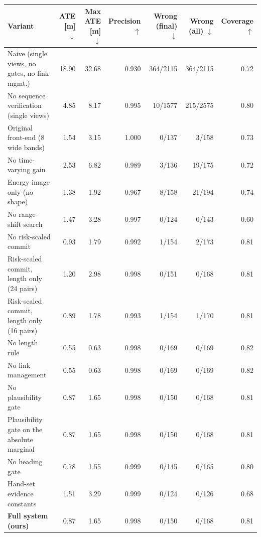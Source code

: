 \begin{tabular}{lrrrrrr}
\toprule
Variant & ATE [m] $\downarrow$ & Max ATE [m] $\downarrow$ & Precision $\uparrow$ & Wrong (final) $\downarrow$ & Wrong (all) $\downarrow$ & Coverage $\uparrow$ \\
\midrule
Naive (single views, no gates, no link mgmt.) & 18.90 & 32.68 & 0.930 & 364/2115 & 364/2115 & 0.72 \\
No sequence verification (single views) & 4.85 & 8.17 & 0.995 & 10/1577 & 215/2575 & 0.80 \\
Original front-end (8 wide bands) & 1.54 & 3.15 & 1.000 & 0/137 & 3/158 & 0.73 \\
No time-varying gain & 2.53 & 6.82 & 0.989 & 3/136 & 19/175 & 0.72 \\
Energy image only (no shape) & 1.38 & 1.92 & 0.967 & 8/158 & 21/194 & 0.74 \\
No range-shift search & 1.47 & 3.28 & 0.997 & 0/124 & 0/143 & 0.60 \\
No risk-scaled commit & 0.93 & 1.79 & 0.992 & 1/154 & 2/173 & 0.81 \\
Risk-scaled commit, length only (24 pairs) & 1.20 & 2.98 & 0.998 & 0/151 & 0/168 & 0.81 \\
Risk-scaled commit, length only (16 pairs) & 0.89 & 1.78 & 0.993 & 1/154 & 1/170 & 0.81 \\
No length rule & 0.55 & 0.63 & 0.998 & 0/169 & 0/169 & 0.82 \\
No link management & 0.55 & 0.63 & 0.998 & 0/169 & 0/169 & 0.82 \\
No plausibility gate & 0.87 & 1.65 & 0.998 & 0/150 & 0/168 & 0.81 \\
Plausibility gate on the absolute marginal & 0.87 & 1.65 & 0.998 & 0/150 & 0/168 & 0.81 \\
No heading gate & 0.78 & 1.55 & 0.999 & 0/145 & 0/165 & 0.80 \\
Hand-set evidence constants & 1.51 & 3.29 & 0.999 & 0/124 & 0/126 & 0.68 \\
\midrule
\textbf{Full system (ours)} & 0.87 & 1.65 & 0.998 & 0/150 & 0/168 & 0.81 \\
\bottomrule
\end{tabular}
